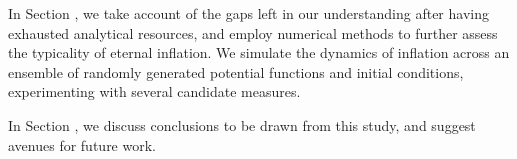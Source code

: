 In Section , we take account of the gaps left in our understanding after having exhausted analytical resources, and employ numerical methods to further assess the typicality of eternal inflation.  
We simulate the dynamics of inflation across an ensemble of randomly generated potential functions and initial conditions, experimenting with several candidate measures.

In Section , we discuss conclusions to be drawn from this study, and suggest avenues for future work.
